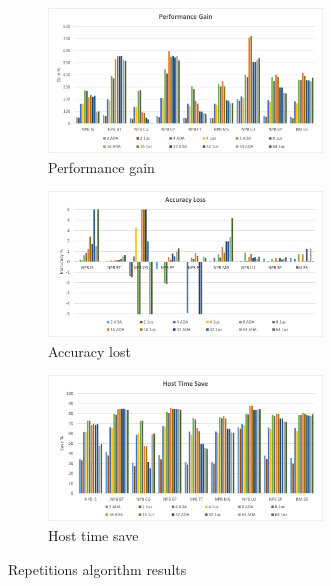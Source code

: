 \begin{figure}[H]
\centering
\begin{subfigure}{\textwidth}
    \centering
    \includegraphics[width=0.8\textwidth]{Images/Performance_ADA.png}
    \caption{ Performance gain}
    \label{fig:Performance_ADAINCPCREP}
\end{subfigure}
\begin{subfigure}{\textwidth}
    \centering
    \includegraphics[width=0.8\textwidth]{Images/Accuracy_ADA.png}
    \caption{ Accuracy lost}
    \label{fig:Accuracy_ADAINCPCREP}
\end{subfigure}
\begin{subfigure}{\textwidth}
    \centering
    \includegraphics[width=0.8\textwidth]{Images/Host_ADA.png}
    \caption{ Host time save}
    \label{fig:Host_ADAINCPCREP}
\end{subfigure}
        
\caption{Repetitions algorithm results}
\label{fig:results_ADAINCPCREP}
\end{figure}



